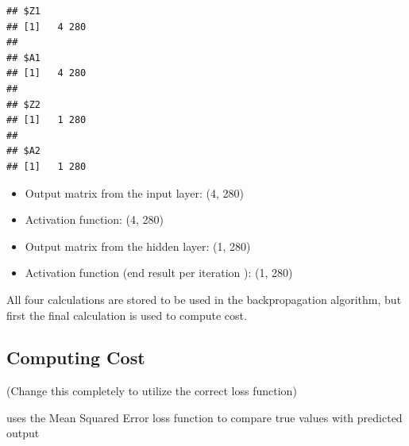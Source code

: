 \begin{Shaded}
\begin{Highlighting}[]
  
\OtherTok{\textless{}{-}} \NormalTok{(} \OtherTok{=}
                 \OtherTok{=}
                 \OtherTok{=}
                 \OtherTok{=}
  
\NormalTok{\}}


\OtherTok{\textless{}{-}} 
\end{Highlighting}
\end{Shaded}

\begin{verbatim}
## $Z1
## [1]   4 280
## 
## $A1
## [1]   4 280
## 
## $Z2
## [1]   1 280
## 
## $A2
## [1]   1 280
\end{verbatim}

\begin{itemize}
\tightlist
\item
  Output matrix from the input layer: (4, 280)
\item
  Activation function: (4, 280)
\item
  Output matrix from the hidden layer: (1, 280)
\item
  Activation function (end result per iteration ): (1, 280)
\end{itemize}

All four calculations are stored to be used in the backpropagation
algorithm, but first the final calculation is used to compute cost.

\hypertarget{computing-cost}{%
\subsection{Computing Cost}\label{computing-cost}}

(Change this completely to utilize the correct loss function)

uses the Mean Squared Error loss function to compare true values with
predicted output

